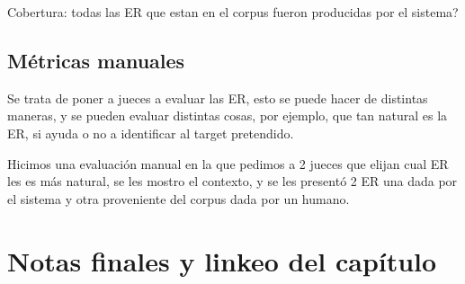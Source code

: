 Cobertura: todas las ER que estan en el corpus fueron producidas por el sistema?







\subsection{M\'etricas manuales}

Se trata de poner a jueces a evaluar las ER, esto se puede hacer de distintas maneras, y se pueden evaluar distintas cosas, por ejemplo, que tan natural es la ER, si ayuda o no a identificar al target pretendido. 

Hicimos una evaluaci\'on manual en la que pedimos a 2 jueces que elijan cual ER les es m\'as natural, se les mostro el contexto, y se les present\'o 2 ER una dada por el sistema y otra proveniente del corpus dada por un humano.


\section{Notas finales y linkeo del cap\'itulo}

